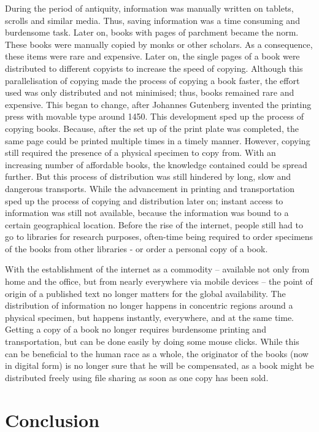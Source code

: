 \documentclass[a4paper]{report}
\begin{document}
During the period of antiquity, information was manually written on tablets, scrolls and similar media. Thus, saving information was a time consuming and burdensome task.  Later on, books with pages of parchment became the norm. These books were manually copied by monks or other scholars. As a consequence, these items were rare and expensive. Later on, the single pages of a book were distributed to different copyists to increase the speed of copying. Although this parallelisation of copying made the process of copying a book faster, the effort used was only distributed and not minimised; thus, books remained rare and expensive. This began to change, after Johannes Gutenberg invented the printing press with movable type around 1450. This development sped up the process of copying books. Because, after the set up of the print plate was completed, the same page could be printed multiple times in a timely manner. However, copying still required the presence of a physical specimen to copy from. With an increasing number of affordable books, the knowledge contained could be spread further. But this process of distribution was still hindered by long, slow and dangerous transports. While the advancement in printing and transportation sped up the process of copying and distribution later on; instant access to information was still not available, because the information was bound to a certain geographical location. Before the rise of the internet, people still had to go to libraries for research purposes, often-time being required to order specimens of the books from other libraries - or order a personal copy of a book.

With the establishment of the internet as a commodity -- available not only from home and the office, but from nearly everywhere via mobile devices -- the point of origin of a published text no longer matters for the global availability. The distribution of information no longer happens in concentric regions around a physical specimen, but happens instantly, everywhere, and at the same time. Getting a copy of a book no longer requires burdensome printing and transportation, but can be done easily by doing some mouse clicks. While this can be beneficial to the human race as a whole, the originator of the books (now in digital form) is no longer sure that he will be compensated, as a book might be distributed freely using file sharing as soon as one copy has been sold.

\chapter{Conclusion}

\newpage

\printbibliography
\end{document}

